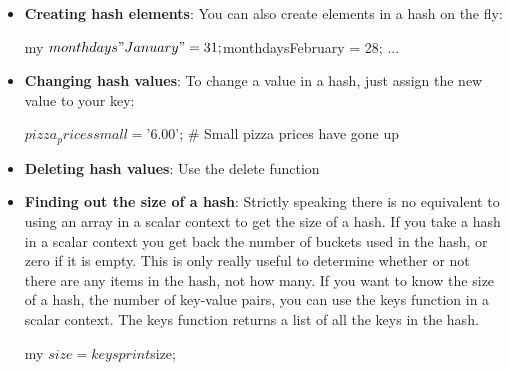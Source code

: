 \documentclass{report}
\begin{document}
\begin{itemize}
        \item \textbf{Creating hash elements}: You can also create elements in a hash on the fly:
            \bigbreak \noindent 
            \begin{perlcode}
                my %
                $monthdays{"January"} = 31;
                $monthdays{February} = 28;
                ...
            \end{perlcode}
        \item \textbf{Changing hash values}: To change a value in a hash, just assign the new value to your key:
            \bigbreak \noindent 
            \begin{perlcode}
            $pizza_prices{small} = ’$6.00’; # Small pizza prices have gone up
            \end{perlcode}
        \item \textbf{Deleting hash values}: Use the delete function
            \bigbreak \noindent 
        \item \textbf{Finding out the size of a hash}: Strictly speaking there is no equivalent to using an array in a scalar context to get the size of a hash. If you take a hash in a scalar context you get back the number of buckets used in the hash, or zero if it is empty. This is only really useful to determine whether or not there are any items in the hash, not how many.
            \bigbreak \noindent 
            If you want to know the size of a hash, the number of key-value pairs, you can use the keys function in a scalar context. The keys function returns a list of all the keys in the hash.
            \bigbreak \noindent 
            \begin{perlcode}
                my $size = keys %
                print $size; 
            \end{perlcode}

    \end{itemize}
\end{document}
